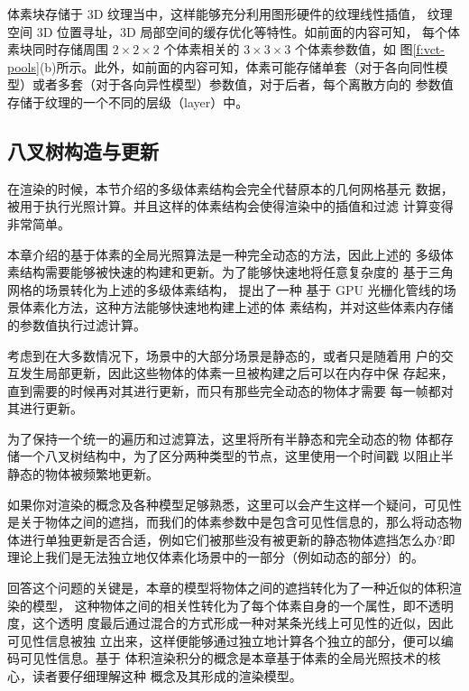 体素块存储于 3D 纹理当中，这样能够充分利用图形硬件的纹理线性插值， 纹理空间 3D 位置寻址，3D 局部空间的缓存优化等特性。如前面的内容可知， 每个体素块同时存储周围 $2\times 2\times 2$ 个体素相关的 $3\times 3\times 3$ 个体素参数值，如 图\ref{f:vct-pools}(b)所示。此外，如前面的内容可知，体素可能存储单套（对于各向同性模型）或者多套（对于各向异性模型）参数值，对于后者，每个离散方向的 参数值存储于纹理的一个不同的层级（layer）中。




\subsection{八叉树构造与更新}\label{sec:vct-octree-build-and-update}
在渲染的时候，本节介绍的多级体素结构会完全代替原本的几何网格基元 数据，被用于执行光照计算。并且这样的体素结构会使得渲染中的插值和过滤 计算变得非常简单。

本章介绍的基于体素的全局光照算法是一种完全动态的方法，因此上述的 多级体素结构需要能够被快速的构建和更新。为了能够快速地将任意复杂度的 基于三角网格的场景转化为上述的多级体素结构，\cite{a:Gigavoxels:Avoxelbasedrenderingpipelineforefficientexplorationoflargeanddetailedscenes} 提出了一种 基于 GPU 光栅化管线的场景体素化方法，这种方法能够快速地构建上述的体 素结构，并对这些体素内存储的参数值执行过滤计算。

考虑到在大多数情况下，场景中的大部分场景是静态的，或者只是随着用 户的交互发生局部更新，因此这些物体的体素一旦被构建之后可以在内存中保 存起来，直到需要的时候再对其进行更新，而只有那些完全动态的物体才需要 每一帧都对其进行更新。

为了保持一个统一的遍历和过滤算法，这里将所有半静态和完全动态的物 体都存储一个八叉树结构中，为了区分两种类型的节点，这里使用一个时间戳 以阻止半静态的物体被频繁地更新。

\begin{myshaded}
	如果你对渲染的概念及各种模型足够熟悉，这里可以会产生这样一个疑问，可见性 是关于物体之间的遮挡，而我们的体素参数中是包含可见性信息的，那么将动态物 体进行单独更新是否合适，例如它们被那些没有被更新的静态物体遮挡怎么办?即 理论上我们是无法独立地仅体素化场景中的一部分（例如动态的部分）的。
	
	回答这个问题的关键是，本章的模型将物体之间的遮挡转化为了一种近似的体积渲染的模型， 这种物体之间的相关性转化为了每个体素自身的一个属性，即不透明度，这个透明 度最后通过混合的方式形成一种对某条光线上可见性的近似，因此可见性信息被独 立出来，这样便能够通过独立地计算各个独立的部分，便可以编码可见性信息。基于 体积渲染积分的概念是本章基于体素的全局光照技术的核心，读者要仔细理解这种 概念及其形成的渲染模型。
\end{myshaded}



